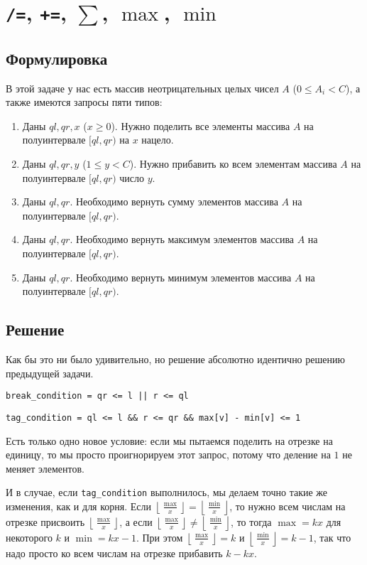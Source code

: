 \cprotect \section{\verb+/=+, \verb^+=^, $\sum$, $\max$, $\min$}

\subsection{Формулировка}

В этой задаче у нас есть массив неотрицательных целых чисел $A$ ($0 \le A_i < C$), а также имеются запросы пяти типов:

\begin{enumerate}
    \item Даны $ql, qr, x$ ($x \ge 0$). Нужно поделить все элементы массива $A$ на полуинтервале $[ql, qr)$ на $x$ нацело.
    \item Даны $ql, qr, y$ ($1 \le y < C$). Нужно прибавить ко всем элементам массива $A$ на полуинтервале $[ql, qr)$ число $y$.
    \item Даны $ql, qr$. Необходимо вернуть сумму элементов массива $A$ на полуинтервале $[ql, qr)$.
    \item Даны $ql, qr$. Необходимо вернуть максимум элементов массива $A$ на полуинтервале $[ql, qr)$.
    \item Даны $ql, qr$. Необходимо вернуть минимум элементов массива $A$ на полуинтервале $[ql, qr)$.
\end{enumerate}

\subsection{Решение}

Как бы это ни было удивительно, но решение абсолютно идентично решению предыдущей задачи.

\verb+break_condition = qr <= l || r <= ql+

\verb+tag_condition = ql <= l && r <= qr && max[v] - min[v] <= 1+

Есть только одно новое условие: если мы пытаемся поделить на отрезке на единицу, то мы просто проигнорируем этот запрос, потому что деление на $1$ не меняет элементов.

И в случае, если \verb+tag_condition+ выполнилось, мы делаем точно такие же изменения, как и для корня. Если $\left\lfloor \frac{\max}{x} \right\rfloor = \left\lfloor \frac{\min}{x} \right\rfloor$, то нужно всем числам на отрезке присвоить $\left\lfloor \frac{\max}{x} \right\rfloor$, а если $\left\lfloor \frac{\max}{x} \right\rfloor \neq \left\lfloor \frac{\min}{x} \right\rfloor$, то тогда $\max = kx$ для некоторого $k$ и $\min = kx - 1$. При этом $\left\lfloor \frac{\max}{x} \right\rfloor = k$ и $\left\lfloor \frac{\min}{x} \right\rfloor = k - 1$, так что надо просто ко всем числам на отрезке прибавить $k - kx$.

